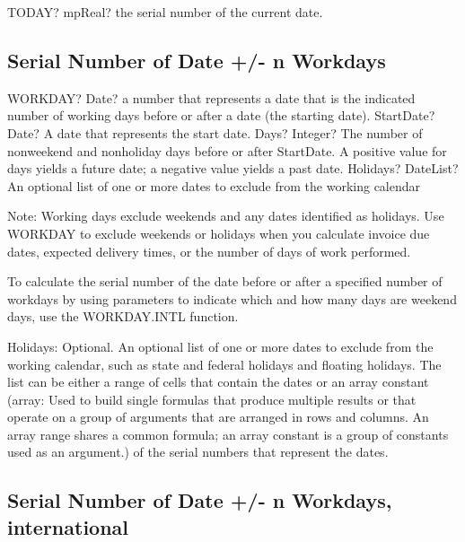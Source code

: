 \begin{mpFunctionsExtract}
	\mpWorksheetFunctionZeroNotImplemented
	{TODAY? mpReal? the serial number of the current date.}
\end{mpFunctionsExtract}




\subsection{Serial Number of Date +/- n Workdays}

\begin{mpFunctionsExtract}
	\mpWorksheetFunctionThreeNotImplemented
	{WORKDAY? Date? a number that represents a date that is the indicated number of working days before or after a date (the starting date).}
	{StartDate? Date? A date that represents the start date.}
	{Days? Integer? The number of nonweekend and nonholiday days before or after StartDate. A positive value for days yields a future date; a negative value yields a past date.}
	{Holidays? DateList?  An optional list of one or more dates to exclude from the working calendar}
\end{mpFunctionsExtract}

\vspace{0.3cm}
Note: Working days exclude weekends and any dates identified as holidays. Use WORKDAY to exclude weekends or holidays when you calculate invoice due dates, expected delivery times, or the number of days of work performed.

To calculate the serial number of the date before or after a specified number of workdays by using parameters to indicate which and how many days are weekend days, use the WORKDAY.INTL function.

Holidays:  Optional. An optional list of one or more dates to exclude from the working calendar, such as state and federal holidays and floating holidays. The list can be either a range of cells that contain the dates or an array constant (array: Used to build single formulas that produce multiple results or that operate on a group of arguments that are arranged in rows and columns. An array range shares a common formula; an array constant is a group of constants used as an argument.) of the serial numbers that represent the dates.




\subsection{Serial Number of Date +/- n Workdays, international}

